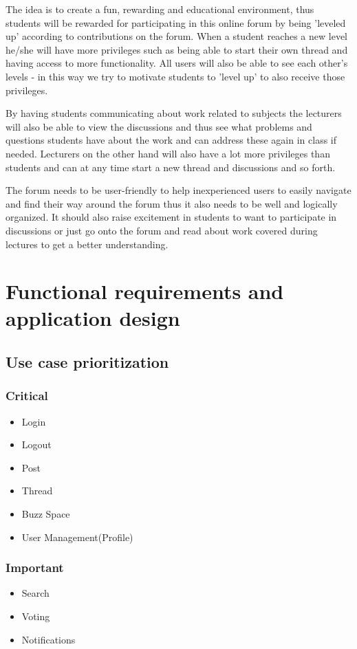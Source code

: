 \documentclass[12pt, oneside]{article}
\begin{document}
The idea is to create a fun, rewarding and educational environment, thus students will be rewarded for participating in this online forum by being 'leveled up' according to contributions on the forum. When a student reaches a new level he/she will have more privileges such as being able to start their own thread and having access to more functionality. All users will also be able to see each other's levels - in this way we try to motivate students to 'level up' to also receive those privileges.   

By having students communicating about work related to subjects the lecturers will also be able to view the discussions and thus see what problems and questions students have about the work and can address these again in class if needed. Lecturers on the other hand will also have a lot more privileges than students and can at any time start a new thread and discussions and so forth. 

The forum needs to be user-friendly to help inexperienced users to easily navigate and find their way around the forum thus it also needs to be well and logically organized. It should also raise excitement in students to want to participate in discussions or just go onto the forum and read about work covered during lectures to get a better understanding. 

	
\section{Functional requirements and application design}
	\subsection{Use case prioritization}
		\subsubsection{Critical}
			\begin{itemize}
				\item Login
				\item Logout
				\item Post
				\item Thread
				\item Buzz Space
				\item User Management(Profile)
			 \end{itemize}
		\subsubsection{Important}
			\begin{itemize}
				\item Search
				\item Voting
				\item Notifications
			 \end{itemize}
\end{document}

